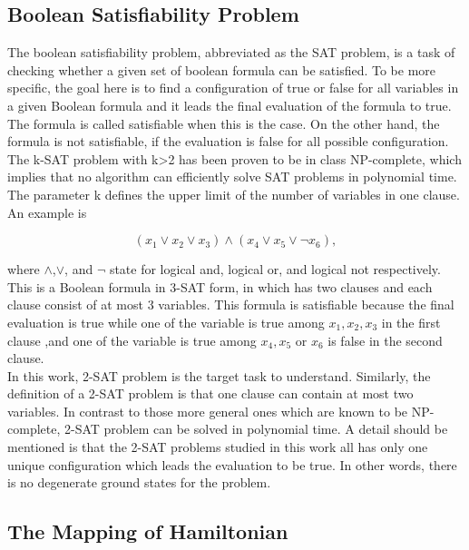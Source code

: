 \documentclass[twoside,a4paper,article]{combine}
\begin{document}
\subsection{Boolean Satisfiability Problem}

The boolean satisfiability problem, abbreviated as the SAT problem, is a task of checking whether a given set of boolean formula can be satisfied. To be more specific, the goal here is to find a configuration of true or false for all variables in a given Boolean formula and it leads the final evaluation of the formula to true. The formula is called satisfiable when this is the case. On the other hand, the formula is not satisfiable, if the evaluation is false for all possible configuration.  \\

The k-SAT problem with k>2 has been proven to be in class NP-complete, which implies that no algorithm can efficiently solve SAT problems in polynomial time. The parameter k defines the upper limit of the number of variables in one clause. An example is 

\begin{equation*}
 (x_1\lor x_2\lor x_3)\land (x_4\lor x_5\lor \neg x_6),
\end{equation*}

where $\land$,$\lor$, and $\neg$ state for logical and, logical or, and logical not respectively. This is a Boolean formula in 3-SAT form, in which has two clauses and each clause consist of at most 3 variables. This formula is satisfiable because the final evaluation is true while one of the variable is true among $x_1, x_2, x_3$ in the first clause ,and one of the variable is true among $x_4, x_5$ or $x_6$ is false in the second clause. \\

In this work, 2-SAT problem is the target task to understand. Similarly, the definition of a 2-SAT problem is that one clause can contain at most two variables. In contrast to those more general ones which are known to be NP-complete, 2-SAT problem can be solved in polynomial time. A detail should be mentioned is that the 2-SAT problems studied in this work all has only one unique configuration which leads the evaluation to be true. In other words, there is no degenerate ground states for the problem. \\
 
\subsection{The Mapping of Hamiltonian}
\label{The Mapping of Hamiltonian}
\end{document}
